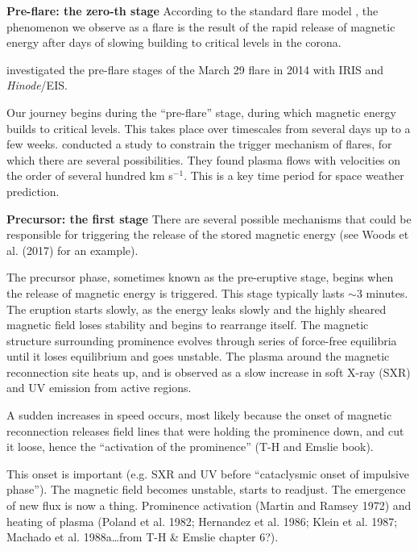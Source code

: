 \textbf{Pre-flare: the zero-th stage}\quad
According to the standard flare model ,
the phenomenon we observe as a flare is the result of the rapid
release of magnetic energy after
days of slowing building to critical levels in the corona.

\cite{Woods2017} investigated the pre-flare stages of
the March 29 flare in 2014
with IRIS and \textit{Hinode}/EIS.


Our journey begins during the ``pre-flare'' stage, during which magnetic energy
builds to critical levels.
This takes place over timescales from several days up to a few weeks.
\cite{Woods2017}
conducted a study to constrain the trigger mechanism
of flares, for which there are several possibilities. They found plasma flows
with velocities on the order of several hundred km s$^{-1}$.
This is a key time period for space weather prediction.




\textbf{Precursor: the first stage}\quad
There are several possible mechanisms that could be responsible for triggering
the release of the stored magnetic energy (see Woods et al. (2017) for an
example).

The precursor phase, sometimes known as the pre-eruptive stage,
begins when the release of magnetic energy is triggered.
This stage typically lasts $\sim$3 minutes.
The eruption starts slowly, as
the energy leaks slowly and the
highly sheared magnetic field loses
stability and begins to rearrange itself.
The magnetic
structure surrounding prominence evolves through series of force-free
equilibria until it loses equilibrium and goes unstable.
The plasma around the magnetic reconnection site heats up,
and is observed as a
slow increase in soft X-ray (SXR) and UV emission from active regions.

A sudden increases in speed occurs,
most likely because the onset of magnetic
reconnection releases field lines that were holding the prominence down,
and cut it loose, hence the
``activation of the prominence'' (T-H and Emslie book).


This onset is important (e.g. SXR and UV before ``cataclysmic onset of impulsive
phase''). The magnetic field becomes unstable, starts to readjust. The emergence
of new flux is now a thing. Prominence activation (Martin and Ramsey 1972) and
heating of plasma (Poland et al. 1982; Hernandez et al. 1986; Klein et al.
1987; Machado et al. 1988a\ldots from T-H \& Emslie chapter 6?).


